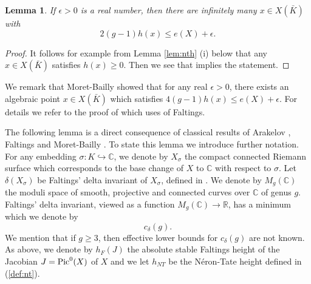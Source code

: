 \documentclass[11pt]{article}
\newtheorem{lemma}[theorem]{Lemma}
\numberwithin{equation}{section}
\newcommand {\CC}  {{\mathbb C}}
\newcommand {\p} {x}
\begin{document}
\begin{lemma}\label{lem:zhang}
If $\epsilon>0$ is a real number, then there are infinitely many $\p\in X(\bar{K})$ with $$2(g-1)h(\p)\leq e(X)+\epsilon.$$
\end{lemma}
\begin{proof} It follows for example from Lemma \ref{lem:nth} (i) below that any $x\in X(\bar{K})$ satisfies $h(x)\geq 0$. Then we see that \cite[Theorem 6.3]{zhang:positive} implies the statement.\end{proof}

We remark that Moret-Bailly showed that for any real $\epsilon>0$, there exists an algebraic point $x\in X(\bar{K})$ which satisfies  $4(g-1)h(x)\leq e(X)+\epsilon$. For details we refer to the proof of \cite[Proposition 3.4]{moret-bailly:effmordell} which uses  \cite[Corollary, p.406]{faltings:arithmeticsurfaces} of Faltings. 


The following lemma is a direct consequence of classical results of Arakelov \cite{arakelov:intersectiontheory}, Faltings \cite{faltings:arithmeticsurfaces} and Moret-Bailly \cite{moba:noether}. To state this lemma we introduce further notation. For any embedding $\sigma:K\hookrightarrow \CC$, we denote by $X_\sigma$ the compact connected Riemann surface which corresponds to the base change of $X$ to $\mathbb C$ with respect to $\sigma$. Let
$
\delta(X_\sigma)
$
be Faltings' delta invariant of $X_\sigma$, defined in \cite[p.402]{faltings:arithmeticsurfaces}. We denote by $M_g(\CC)$  the moduli space of smooth, projective and connected curves over $\CC$ of genus $g$. Faltings' delta invariant, viewed as a function $M_g(\CC)\to \mathbb R$, has a minimum which we denote by 
\begin{equation}\label{def:delta}
c_\delta(g).
\end{equation}
We mention that if $g\geq 3$, then effective lower bounds for $c_\delta(g)$  are not known. As above, we denote by $h_F(J)$ the absolute stable Faltings height of the Jacobian $J=\textnormal{Pic}^0(X)$ of $X$ and we let $h_{NT}$ be the N\'eron-Tate height defined in (\ref{def:nt}).
\end{document}
